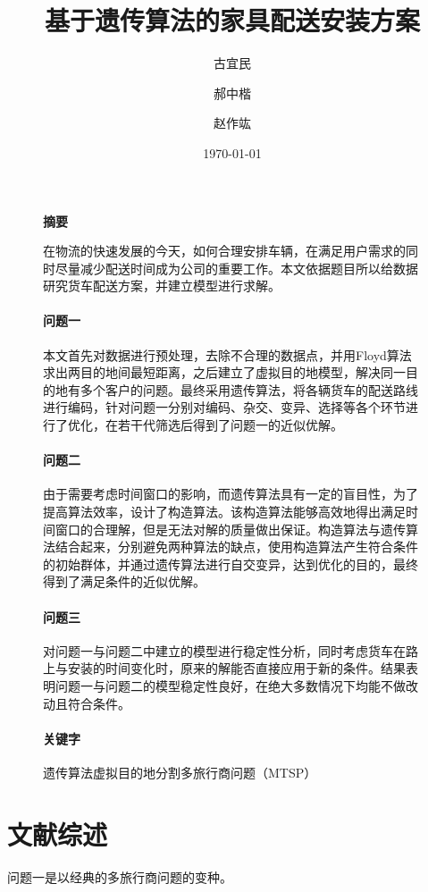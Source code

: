 \documentclass[UTF8,cs4size]{ctexart}
\title{\heiti 基于遗传算法的家具配送安装方案}
\date{\kaishu \today}
\author{\kaishu 古宜民 \and \kaishu 郝中楷 \and \kaishu 赵作竑}
\begin{document}
\maketitle
\begin{figure}[!htbp]
\setlength{\leftskip}{1.3cm}
\setlength{\rightskip}{1.3cm}
\begin{center}
\textbf{\large 摘要}
\end{center}
在物流的快速发展的今天，如何合理安排车辆，在满足用户需求的同时尽量减少配送时间成为公司的重要工作。本文依据题目所以给数据研究货车配送方案，并建立模型进行求解。

\paragraph{问题一} 本文首先对数据进行预处理，去除不合理的数据点，并用Floyd算法求出两目的地间最短距离，之后建立了虚拟目的地模型，解决同一目的地有多个客户的问题。最终采用遗传算法，将各辆货车的配送路线进行编码，针对问题一分别对编码、杂交、变异、选择等各个环节进行了优化，在若干代筛选后得到了问题一的近似优解。

\paragraph{问题二}由于需要考虑时间窗口的影响，而遗传算法具有一定的盲目性，为了提高算法效率，设计了构造算法。该构造算法能够高效地得出满足时间窗口的合理解，但是无法对解的质量做出保证。构造算法与遗传算法结合起来，分别避免两种算法的缺点，使用构造算法产生符合条件的初始群体，并通过遗传算法进行自交变异，达到优化的目的，最终得到了满足条件的近似优解。

\paragraph{问题三}对问题一与问题二中建立的模型进行稳定性分析，同时考虑货车在路上与安装的时间变化时，原来的解能否直接应用于新的条件。结果表明问题一与问题二的模型稳定性良好，在绝大多数情况下均能不做改动且符合条件。

\paragraph{关键字} 遗传算法\hfill 虚拟目的地\hfill 分割\hfill 多旅行商问题（MTSP）
\end{figure}
\clearpage
\tableofcontents
\clearpage
\section{文献综述}
问题一是以经典的多旅行商问题的变种。
\end{document}
